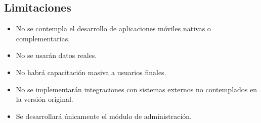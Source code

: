 \subsection{Limitaciones}

\begin{itemize}
    \item No se contempla el desarrollo de aplicaciones móviles nativas o complementarias.
    \item No se usarán datos reales.
    \item No habrá capacitación masiva a usuarios finales.
    \item No se implementarán integraciones con sistemas externos no contemplados en la versión original.
    \item Se desarrollará únicamente el módulo de administración.
\end{itemize}

